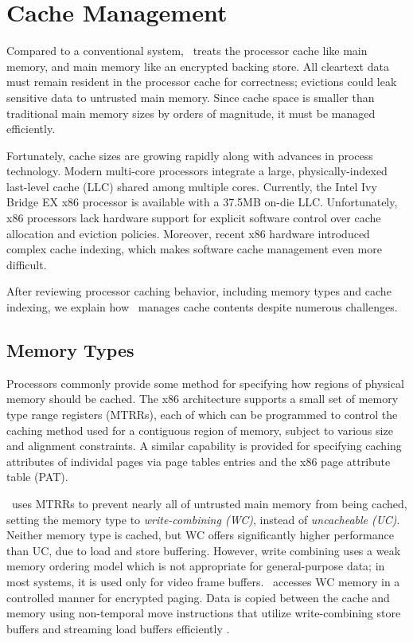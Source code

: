\section{Cache Management}

Compared to a conventional system, \vcage\ treats the processor cache
like main memory, and main memory like an encrypted backing store.
All cleartext data must remain resident in the processor cache for
correctness; evictions could leak sensitive data to untrusted main
memory.  Since cache space is smaller than traditional main memory
sizes by orders of magnitude, it must be managed efficiently.

Fortunately, cache sizes are growing rapidly along with advances in
process technology.  Modern multi-core processors integrate a large,
physically-indexed last-level cache (LLC) shared among multiple cores.
Currently, the Intel Ivy Bridge EX x86 processor is available with a
37.5MB on-die LLC.  Unfortunately, x86 processors lack hardware
support for explicit software control over cache allocation and
eviction policies.  Moreover, recent x86 hardware introduced complex
cache indexing, which makes software cache management even more
difficult.

After reviewing processor caching behavior, including memory types and
cache indexing, we explain how \vcage\ manages cache contents despite
numerous challenges.

\subsection{Memory Types}

Processors commonly provide some method for specifying how regions of
physical memory should be cached.  The x86 architecture
\cite{Intel-SDM} supports a small set of memory type range registers
(MTRRs), each of which can be programmed to control the caching method
used for a contiguous region of memory, subject to various size and
alignment constraints.  A similar capability is provided for
specifying caching attributes of individal pages via page tables
entries and the x86 page attribute table (PAT).

\vcage\ uses MTRRs to prevent nearly all of untrusted main memory from
being cached, setting the memory type to {\em write-combining (WC)},
instead of {\em uncacheable (UC)}. Neither memory type is cached, but
WC offers significantly higher performance than UC, due to load and
store buffering.  However, write combining uses a weak memory ordering
model which is not appropriate for general-purpose data; in most
systems, it is used only for video frame buffers.  \vcage\ accesses WC
memory in a controlled manner for encrypted paging.  Data is copied
between the cache and memory using non-temporal move instructions
that utilize write-combining store buffers and streaming load buffers
efficiently \cite{Intel-SDM}.

